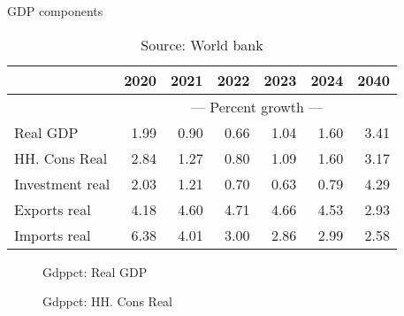 \documentclass{article}
\begin{document}
\begin{table}[ht]
\caption{GDP components}
\begin{tabular}{lrrrrr|r}
\toprule
 & 2020 & 2021 & 2022 & 2023 & 2024 & 2040 \\
\midrule
&\multicolumn{6}{c}{{---  Percent growth ---}}                               \\
Real GDP & 1.99 & 0.90 & 0.66 & 1.04 & 1.60 & 3.41 \\
HH. Cons Real & 2.84 & 1.27 & 0.80 & 1.09 & 1.60 & 3.17 \\
Investment real & 2.03 & 1.21 & 0.70 & 0.63 & 0.79 & 4.29 \\
Exports real & 4.18 & 4.60 & 4.71 & 4.66 & 4.53 & 2.93 \\
Imports real & 6.38 & 4.01 & 3.00 & 2.86 & 2.99 & 2.58 \\
\bottomrule
\end{tabular}
\caption*{Source: World bank }
\end{table}

 
\begin{figure}[htbp]
\centering
\resizebox{\textwidth}{!}{}
\caption{Gdppct: Real GDP}
\end{figure}

 
\begin{figure}[htbp]
\centering
\resizebox{\textwidth}{!}{}
\caption{Gdppct: HH. Cons Real}
\end{figure}
\end{document}
